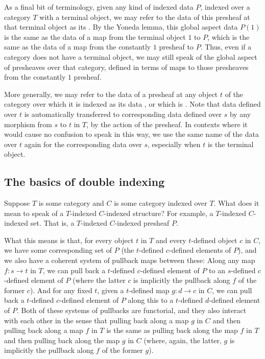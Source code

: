 As a final bit of terminology, given any kind of indexed data $P$, indexed over a category $T$ with a terminal object, we may refer to the data of this presheaf at that terminal object as its . By the Yoneda lemma, this global aspect data $P(1)$ is the same as the data of a map from the terminal object $1$ to $P$, which is the same as the data of a map from the constantly $1$ presheaf to $P$. Thus, even if a category does not have a terminal object, we may still speak of the global aspect of presheaves over that category, defined in terms of maps to those presheaves from the constantly $1$ presheaf.

More generally, we may refer to the data of a presheaf at any object $t$ of the category over which it is indexed as its data , or which is . Note that data defined over $t$ is automatically transferred to corresponding data defined over $s$ by any morphism from $s$ to $t$ in $T$, by the action of the presheaf. In contexts where it would cause no confusion to speak in this way, we use the same name of the data over $t$ again for the corresponding data over $s$, especially when $t$ is the terminal object. 

\subsection{The basics of double indexing}
Suppose $T$ is some category and $C$ is some category indexed over $T$. What does it mean to speak of a $T$-indexed $C$-indexed structure? For example, a $T$-indexed $C$-indexed set. That is, a $T$-indexed $C$-indexed presheaf $P$.

What this means is that, for every object $t$ in $T$ and every $t$-defined object $c$ in $C$, we have some corresponding set of $P$ (the $t$-defined $c$-defined elements of $P$), and we also have a coherent system of pullback maps between these: Along any map $f : s \to t$ in $T$, we can pull back a $t$-defined $c$-defined element of $P$ to an $s$-defined $c$-defined element of $P$ (where the latter $c$ is implicitly the pullback along $f$ of the former $c$). And for any fixed $t$, given a $t$-defined map $g : d \to c$ in $C$, we can pull back a $t$-defined $c$-defined element of $P$ along this to a $t$-defined $d$-defined element of $P$. Both of these systems of pullbacks are functorial, and they also interact with each other  in the sense that pulling back along a map $g$ in $C$ and then pulling back along a map $f$ in $T$ is the same as pulling back along the map $f$ in $T$ and then pulling back along the map $g$ in $C$ (where, again, the latter, $g$ is implicitly the pullback along $f$ of the former $g$).

